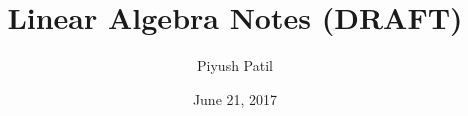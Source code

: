 \documentclass{article}
\begin{document}
\title{Linear Algebra Notes (DRAFT)}
\author{Piyush Patil}
\date{June 21, 2017}
\maketitle

\end{document}
